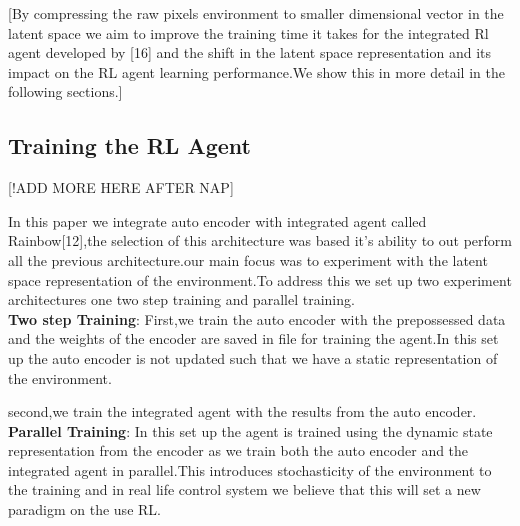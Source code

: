 [By compressing the raw pixels environment to smaller dimensional vector in the latent space we aim to improve the training time it takes for the integrated Rl agent developed by [16] and the shift in the latent space representation and its impact on the RL agent learning performance.We show this in more detail in the following sections.]


\subsection{Training the RL Agent} [!ADD MORE HERE AFTER NAP]

In this paper we integrate auto encoder with integrated agent called Rainbow[12],the selection of this architecture  was based it's ability to out perform all the previous architecture.our main focus was to experiment with the latent space representation of the environment.To address this we set up two experiment architectures one two step training and parallel training.\\

\textbf{Two step Training}: First,we train the auto encoder with the prepossessed data and the weights of the encoder are saved in file for training the agent.In this set up the auto encoder is not updated such that we have a static representation of the environment.

second,we train the integrated agent with the results from the auto encoder.\\

\textbf{Parallel Training}:
In this set up the agent is trained using the dynamic state representation from the encoder as we train both the auto encoder and the integrated agent in parallel.This introduces stochasticity of the environment to the training  and in real life control system we believe that this will set a new paradigm on the use RL.







